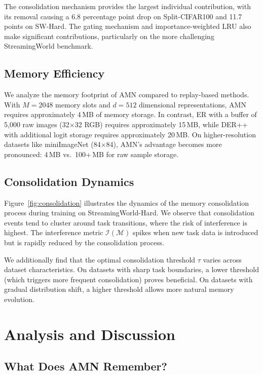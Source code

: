 \documentclass[11pt]{article}
\begin{document}
The consolidation mechanism provides the largest individual contribution, with its removal causing a 6.8 percentage point drop on Split-CIFAR100 and 11.7 points on SW-Hard. The gating mechanism and importance-weighted LRU also make significant contributions, particularly on the more challenging StreamingWorld benchmark.

\subsection{Memory Efficiency}

We analyze the memory footprint of AMN compared to replay-based methods. With $M = 2048$ memory slots and $d = 512$ dimensional representations, AMN requires approximately 4\,MB of memory storage. In contrast, ER with a buffer of 5,000 raw images (32$\times$32 RGB) requires approximately 15\,MB, while DER++ with additional logit storage requires approximately 20\,MB. On higher-resolution datasets like miniImageNet (84$\times$84), AMN's advantage becomes more pronounced: 4\,MB vs.\ 100+\,MB for raw sample storage.

\subsection{Consolidation Dynamics}

Figure~\ref{fig:consolidation} illustrates the dynamics of the memory consolidation process during training on StreamingWorld-Hard. We observe that consolidation events tend to cluster around task transitions, where the risk of interference is highest. The interference metric $\mathcal{I}(\mathcal{M})$ spikes when new task data is introduced but is rapidly reduced by the consolidation process.

We additionally find that the optimal consolidation threshold $\tau$ varies across dataset characteristics. On datasets with sharp task boundaries, a lower threshold (which triggers more frequent consolidation) proves beneficial. On datasets with gradual distribution shift, a higher threshold allows more natural memory evolution.

\section{Analysis and Discussion}
\label{sec:analysis}

\subsection{What Does AMN Remember?}
\end{document}

